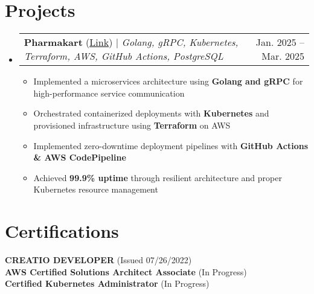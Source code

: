 \documentclass[letterpaper,11pt]{article}
\makeatletter
\newcommand{\resumeItem}[1]{
  \item\small{
    {#1 \vspace{-2pt}}
  }
}
\newcommand{\resumeProjectHeading}[2]{
    \item
    \begin{tabular*}{0.97\textwidth}{l@{\extracolsep{\fill}}r}
      \small#1 & #2 \\
    \end{tabular*}\vspace{-7pt}
}
\newcommand{\resumeSubHeadingListStart}{\begin{itemize}[leftmargin=0.15in, label={}]}
\newcommand{\resumeSubHeadingListEnd}{\end{itemize}}
\newcommand{\resumeItemListStart}{\begin{itemize}}
\newcommand{\resumeItemListEnd}{\end{itemize}\vspace{-5pt}}
\makeatother
\begin{document}
\section{Projects}
    \resumeSubHeadingListStart
      \resumeProjectHeading
          {\textbf{Pharmakart} (\href{https://github.com/pharmakart/pharmakart-web}{\underline{Link}}) $|$ \emph{Golang, gRPC, Kubernetes, Terraform, AWS, GitHub Actions, PostgreSQL}}{Jan. 2025 -- Mar. 2025}
          \resumeItemListStart
          \resumeItem {Implemented a microservices architecture using \textbf{Golang and gRPC} for high-performance service communication}
          \resumeItem {Orchestrated containerized deployments with \textbf{Kubernetes} and provisioned infrastructure using \textbf{Terraform} on AWS}
          \resumeItem {Implemented zero-downtime deployment pipelines with \textbf{GitHub Actions \& AWS CodePipeline}}
          \resumeItem {Achieved \textbf{99.9\% uptime} through resilient architecture and proper Kubernetes resource management}
          \resumeItemListEnd
    \resumeSubHeadingListEnd



%
\section{Certifications}
 \begin{itemize}[leftmargin=0.15in, label={}]
    \small{\item{
        {\textbf{CREATIO DEVELOPER} (Issued 07/26/2022)}\\
        {\textbf{AWS Certified Solutions Architect Associate} (In Progress)}\\
        {\textbf{Certified Kubernetes Administrator} (In Progress)}
    }}
 \end{itemize}


\end{document}
